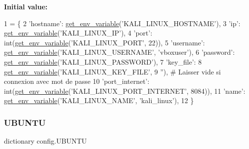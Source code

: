{\bfseries Initial value\+:}
\begin{DoxyCode}
1 =  \{
2     \textcolor{stringliteral}{'hostname'}: \hyperlink{namespaceconfig_a7cf1bd9315cd5f3237441a2d9414082d}{get\_env\_variable}(\textcolor{stringliteral}{'KALI\_LINUX\_HOSTNAME'}),
3     \textcolor{stringliteral}{'ip'}: \hyperlink{namespaceconfig_a7cf1bd9315cd5f3237441a2d9414082d}{get\_env\_variable}(\textcolor{stringliteral}{'KALI\_LINUX\_IP'}),
4     \textcolor{stringliteral}{'port'}: int(\hyperlink{namespaceconfig_a7cf1bd9315cd5f3237441a2d9414082d}{get\_env\_variable}(\textcolor{stringliteral}{'KALI\_LINUX\_PORT'}, 22)),
5     \textcolor{stringliteral}{'username'}: \hyperlink{namespaceconfig_a7cf1bd9315cd5f3237441a2d9414082d}{get\_env\_variable}(\textcolor{stringliteral}{'KALI\_LINUX\_USERNAME'}, \textcolor{stringliteral}{'vboxuser'}),
6     \textcolor{stringliteral}{'password'}: \hyperlink{namespaceconfig_a7cf1bd9315cd5f3237441a2d9414082d}{get\_env\_variable}(\textcolor{stringliteral}{'KALI\_LINUX\_PASSWORD'}),
7     \textcolor{stringliteral}{'key\_file'}:
8     \hyperlink{namespaceconfig_a7cf1bd9315cd5f3237441a2d9414082d}{get\_env\_variable}(\textcolor{stringliteral}{'KALI\_LINUX\_KEY\_FILE'},
9                      \textcolor{stringliteral}{''}),  \textcolor{comment}{# Laisser vide si connexion avec mot de passe}
10     \textcolor{stringliteral}{'port\_internet'}: int(\hyperlink{namespaceconfig_a7cf1bd9315cd5f3237441a2d9414082d}{get\_env\_variable}(\textcolor{stringliteral}{'KALI\_LINUX\_PORT\_INTERNET'}, 8084)),
11     \textcolor{stringliteral}{'name'}: \hyperlink{namespaceconfig_a7cf1bd9315cd5f3237441a2d9414082d}{get\_env\_variable}(\textcolor{stringliteral}{'KALI\_LINUX\_NAME'}, \textcolor{stringliteral}{'kali\_linux'}),
12 \}
\end{DoxyCode}
\mbox{\label{namespaceconfig_a722da23285ba8345159995861911a3b4}} 
\subsubsection{\texorpdfstring{U\+B\+U\+N\+TU}{UBUNTU}}
{\footnotesize\ttfamily dictionary config.\+U\+B\+U\+N\+TU}

